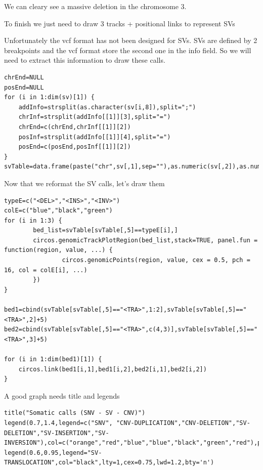We can cleary see a massive deletion in the chromosome 3.

To finish we just need to draw 3 tracks + positional links to represent SVs

Unfortunately the vcf format has not been designed for SVs. SVs are defined by 2 breakpoints and the vcf format store the second one in the info field. So we will need to extract this information to draw these calls.

\begin{steps}
\begin{lstlisting}
chrEnd=NULL
posEnd=NULL
for (i in 1:dim(sv)[1]) {
    addInfo=strsplit(as.character(sv[i,8]),split=";")
    chrInf=strsplit(addInfo[[1]][3],split="=")
    chrEnd=c(chrEnd,chrInf[[1]][2])
    posInf=strsplit(addInfo[[1]][4],split="=")
    posEnd=c(posEnd,posInf[[1]][2])
}
svTable=data.frame(paste("chr",sv[,1],sep=""),as.numeric(sv[,2]),as.numeric(posEnd),paste("chr",chrEnd,sep=""),as.character(sv[,5]))
\end{lstlisting}
\end{steps}

Now that we reformat the SV calls, let's draw them
\begin{steps}
\begin{lstlisting}
typeE=c("<DEL>","<INS>","<INV>")
colE=c("blue","black","green")
for (i in 1:3) { 
        bed_list=svTable[svTable[,5]==typeE[i],]
        circos.genomicTrackPlotRegion(bed_list,stack=TRUE, panel.fun = function(region, value, ...) {
                circos.genomicPoints(region, value, cex = 0.5, pch = 16, col = colE[i], ...)
        })
}

bed1=cbind(svTable[svTable[,5]=="<TRA>",1:2],svTable[svTable[,5]=="<TRA>",2]+5)
bed2=cbind(svTable[svTable[,5]=="<TRA>",c(4,3)],svTable[svTable[,5]=="<TRA>",3]+5)

for (i in 1:dim(bed1)[1]) {
	circos.link(bed1[i,1],bed1[i,2],bed2[i,1],bed2[i,2])
}
\end{lstlisting}
\end{steps}


A good graph needs title and legends

\begin{steps}
\begin{lstlisting}
title("Somatic calls (SNV - SV - CNV)")
legend(0.7,1.4,legend=c("SNV", "CNV-DUPLICATION","CNV-DELETION","SV-DELETION","SV-INSERTION","SV-INVERSION"),col=c("orange","red","blue","blue","black","green","red"),pch=c(16,15,15,16,16,16,16,16),cex=0.75,title="Tracks:",bty='n')
legend(0.6,0.95,legend="SV-TRANSLOCATION",col="black",lty=1,cex=0.75,lwd=1.2,bty='n')
\end{lstlisting}
\end{steps}


